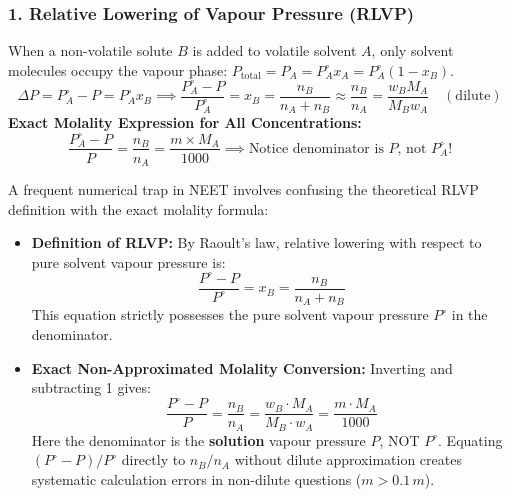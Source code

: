 \documentclass[10pt,a4paper]{article}
\begin{document}
\subsubsection{1. Relative Lowering of Vapour Pressure (RLVP)}
When a non-volatile solute $B$ is added to volatile solvent $A$, only solvent molecules occupy the vapour phase: $P_{\text{total}} = P_A = P_A^\circ x_A = P_A^\circ(1 - x_B)$.
\begin{equation}
  \Delta P = P_A^\circ - P = P_A^\circ x_B \implies \frac{P_A^\circ - P}{P_A^\circ} = x_B = \frac{n_B}{n_A + n_B} \approx \frac{n_B}{n_A} = \frac{w_B M_A}{M_B w_A} \quad (\text{dilute})
\end{equation}
\textbf{Exact Molality Expression for All Concentrations:}
\begin{equation}
  \frac{P_A^\circ - P}{P} = \frac{n_B}{n_A} = \frac{m \times M_A}{1000} \implies \text{Notice denominator is } P\text{, not } P_A^\circ!
\end{equation}

\begin{trapbox}
A frequent numerical trap in NEET involves confusing the theoretical RLVP definition with the exact molality formula:
\begin{itemize}
  \item \textbf{Definition of RLVP:} By Raoult's law, relative lowering with respect to pure solvent vapour pressure is:
  \begin{equation*}
    \frac{P^\circ - P}{P^\circ} = x_B = \frac{n_B}{n_A + n_B}
  \end{equation*}
  This equation strictly possesses the pure solvent vapour pressure $P^\circ$ in the denominator.
  \item \textbf{Exact Non-Approximated Molality Conversion:} Inverting and subtracting 1 gives:
  \begin{equation*}
    \frac{P^\circ - P}{P} = \frac{n_B}{n_A} = \frac{w_B \cdot M_A}{M_B \cdot w_A} = \frac{m \cdot M_A}{1000}
  \end{equation*}
  Here the denominator is the \textbf{solution} vapour pressure $P$, NOT $P^\circ$. Equating $(P^\circ - P)/P^\circ$ directly to $n_B/n_A$ without dilute approximation creates systematic calculation errors in non-dilute questions ($m > 0.1\,\si{m}$).
\end{itemize}
\end{trapbox}
\end{document}
